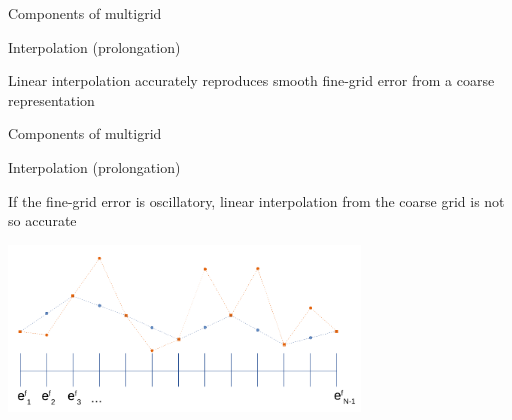 \documentclass[18pt,xcolor=table]{beamer}
\begin{document}
\begin{frame}{Components of multigrid}
\begin{block}{Interpolation (prolongation)}
\bit
\item Linear interpolation accurately reproduces smooth fine-grid error from a coarse representation
\eit
\end{block}
\end{frame}

\begin{frame}{Components of multigrid}
\begin{block}{Interpolation (prolongation)}
\bit
\item If the fine-grid error is oscillatory, linear interpolation from the coarse grid is not so accurate
\eit
\end{block}
\begin{center}
\includegraphics[width=0.7\textwidth]{../figures/coarseCorrectionOscillatory}
\end{center}
\end{frame}
\end{document}
